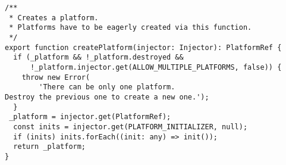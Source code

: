 \begin{verbatim}
/**
 * Creates a platform.
 * Platforms have to be eagerly created via this function.
 */
export function createPlatform(injector: Injector): PlatformRef {
  if (_platform && !_platform.destroyed &&
      !_platform.injector.get(ALLOW_MULTIPLE_PLATFORMS, false)) {
    throw new Error(
        'There can be only one platform.
Destroy the previous one to create a new one.');
  }
 _platform = injector.get(PlatformRef);
  const inits = injector.get(PLATFORM_INITIALIZER, null);
  if (inits) inits.forEach((init: any) => init());
  return _platform;
}
\end{verbatim}
